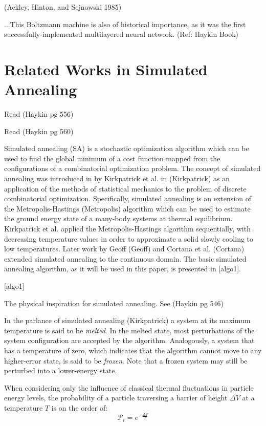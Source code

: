 \documentclass[11pt]{afthesis}
\begin{document}
(Ackley, Hinton, and Sejnowski 1985) 

...This Boltzmann machine is also of historical importance, as it was the first successfully-implemented multilayered neural network. (Ref: Haykin Book)


\section{Related Works in Simulated Annealing}

Read (Haykin pg 556)

Read (Haykin pg 560)

Simulated annealing (SA) is a stochastic optimization algorithm which can be used to find the global minimum of a cost function mapped from the configurations of a combinatorial optimization problem. The concept of simulated annealing was introduced in by Kirkpatrick et al. in (Kirkpatrick) as an application of the methods of statistical mechanics to the problem of discrete combinatorial optimization. Specifically, simulated annealing is an extension of the Metropolis-Hastings (Metropolis) algorithm which can be used to estimate the ground energy state of a many-body systems at thermal equilibrium. Kirkpatrick et al. applied the Metropolis-Hastings algorithm sequentially, with decreasing temperature values in order to approximate a solid slowly cooling to low temperatures. Later work by Geoff (Geoff) and Cortana et al. (Cortana) extended simulated annealing to the continuous domain. The basic simulated annealing algorithm, as it will be used in this paper, is presented in [algo1]. 

[algo1]

The physical inspiration for simulated annealing. See (Haykin pg 546)


In the parlance of simulated annealing (Kirkpatrick) a system at its maximum temperature is said to be \textit{melted}. In the melted state, most perturbations of the system configuration are accepted by the algorithm. Analogously, a system that has a temperature of zero, which indicates that the algorithm cannot move to any higher-error state, is said to be \textit{frozen}. Note that a frozen system may still be perturbed into a lower-energy state.

When considering only the influence of classical thermal fluctuations in particle energy levels, the probability of a particle traversing a barrier of height \begin{math} \Delta V \end{math} at a temperature \begin{math} T \end{math} is on the order of: \begin{equation} 
\mathcal{P}_t = e^{-\frac{\Delta V}{T}} 
\end{equation}
\end{document}
